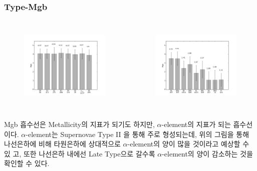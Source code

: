 \documentclass[xcolor={dvipsnames,table}]{beamer}
\newcommand\SSM{\fontsize{7}{7.2}\selectfont}
\begin{document}
\begin{frame}
 \frametitle{Type-Mgb}
 \SSM
  \begin{columns}[t]
   \begin{figure}
    \centering
    \includegraphics[width=6cm, height=4cm]{elmg.png}
   \end{figure}
   \begin{figure}
    \centering
    \includegraphics[width=6cm, height=4cm]{spmg.png}
   \end{figure}
  \end{columns}
\vspace{0.2cm}
Mgb 흡수선은 Metallicity의 지표가 되기도 하지만, $\alpha$-element의 지표가 되는 흡수선이다. $\alpha$-element는 Supernovae Type II
을 통해 주로 형성되는데, 위의 그림을 통해 나선은하에 비해 타원은하에 상대적으로 $\alpha$-element의 양이 많을 것이라고 예상할 수 있
고, 또한 나선은하 내에선 Late Type으로 갈수록 $\alpha$-element의 양이 감소하는 것을 확인할 수 있다.
\end{frame}
\end{document}
